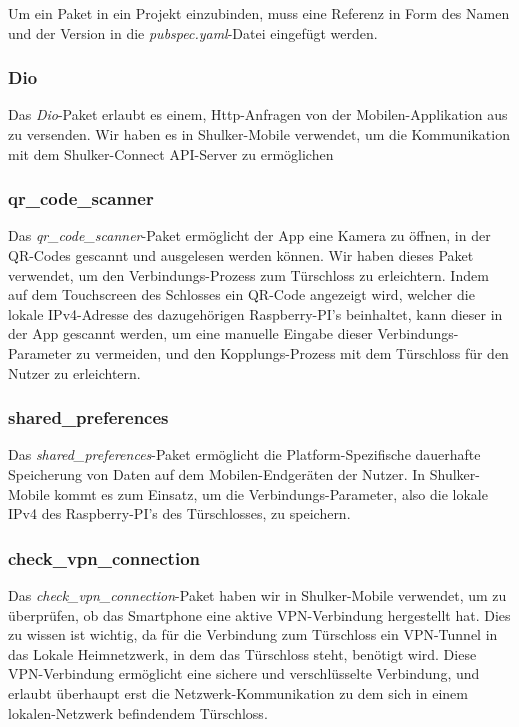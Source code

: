Um ein Paket in ein Projekt einzubinden, muss eine Referenz in Form des Namen und der Version 
in die \textit{pubspec.yaml}-Datei eingefügt werden.


\subsubsection{Dio}
Das \textit{Dio}-Paket erlaubt es einem, Http-Anfragen von der Mobilen-Applikation aus zu versenden.
Wir haben es in Shulker-Mobile verwendet, um die Kommunikation mit dem Shulker-Connect API-Server zu ermöglichen

\subsubsection{qr\_code\_scanner}
Das \textit{qr\_code\_scanner}-Paket ermöglicht der App eine Kamera zu öffnen, in der 
QR-Codes gescannt und ausgelesen werden können. Wir haben dieses Paket verwendet, um den
Verbindungs-Prozess zum Türschloss zu erleichtern. Indem auf dem Touchscreen des Schlosses
ein QR-Code angezeigt wird, welcher die lokale IPv4-Adresse des dazugehörigen Raspberry-PI's
beinhaltet, kann dieser in der App gescannt werden, um eine manuelle Eingabe dieser Verbindungs-Parameter
zu vermeiden, und den Kopplungs-Prozess mit dem Türschloss für den Nutzer zu erleichtern. 

\subsubsection{shared\_preferences}
Das \textit{shared\_preferences}-Paket ermöglicht die Platform-Spezifische dauerhafte Speicherung
von Daten auf dem Mobilen-Endgeräten der Nutzer. In Shulker-Mobile kommt es zum Einsatz, um die 
Verbindungs-Parameter, also die lokale IPv4 des Raspberry-PI's des Türschlosses, zu speichern.

\subsubsection{check\_vpn\_connection}
Das \textit{check\_vpn\_connection}-Paket haben wir in Shulker-Mobile verwendet, um zu überprüfen, ob 
das Smartphone eine aktive VPN-Verbindung hergestellt hat. Dies zu wissen ist wichtig, da für die Verbindung zum Türschloss 
ein VPN-Tunnel in das Lokale Heimnetzwerk, in dem das Türschloss steht, benötigt wird. Diese VPN-Verbindung ermöglicht eine
sichere und verschlüsselte Verbindung, und erlaubt überhaupt erst die Netzwerk-Kommunikation zu dem sich in einem lokalen-Netzwerk
befindendem Türschloss.

